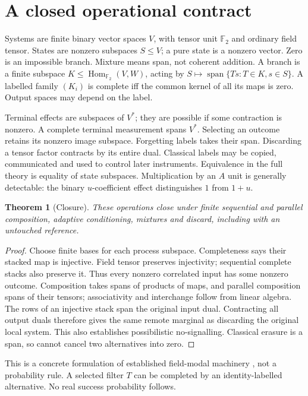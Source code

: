 \documentclass[11pt]{article}
\newtheorem{theorem}{Theorem}
\newcommand{\F}{\mathbb F_2}
\DeclareMathOperator{\Span}{span}
\begin{document}
\section{A closed operational contract}
Systems are finite binary vector spaces $V$, with tensor unit $\F$ and ordinary
field tensor. States are nonzero subspaces $S\leq V$; a pure state is a nonzero
vector. Zero is an impossible branch. Mixture means span, not coherent addition.
A branch is a finite subspace $K\leq\operatorname{Hom}_{\F}(V,W)$, acting by
$S\mapsto\Span\{Ts:T\in K,s\in S\}$. A labelled family $(K_i)$ is complete iff
the common kernel of all its maps is zero. Output spaces may depend on the label.

Terminal effects are subspaces of $V^*$; they are possible if some contraction
is nonzero. A complete terminal measurement spans $V^*$. Selecting an outcome
retains its nonzero image subspace. Forgetting labels takes their span. Discarding
a tensor factor contracts by its entire dual. Classical labels may be copied,
communicated and used to control later instruments. Equivalence in the full
theory is equality of state subspaces. Multiplication by an $A$ unit is generally
detectable: the binary $u$-coefficient effect distinguishes $1$ from $1+u$.

\begin{theorem}[Closure]
These operations close under finite sequential and parallel composition,
adaptive conditioning, mixtures and discard, including with an untouched reference.
\end{theorem}
\begin{proof}
Choose finite bases for each process subspace. Completeness says their stacked
map is injective. Field tensor preserves injectivity; sequential complete stacks
also preserve it. Thus every nonzero correlated input has some nonzero outcome.
Composition takes spans of products of maps, and parallel composition spans of
their tensors; associativity and interchange follow from linear algebra. The
rows of an injective stack span the original input dual. Contracting all output
duals therefore gives the same remote marginal as discarding the original local
system. This also establishes possibilistic no-signalling. Classical erasure is
a span, so cannot cancel two alternatives into zero.
\end{proof}
This is a concrete formulation of established field-modal machinery
\cite{SW12}, not a probability rule. A selected filter $T$ can be completed by an
identity-labelled alternative. No real success probability follows.
\end{document}
